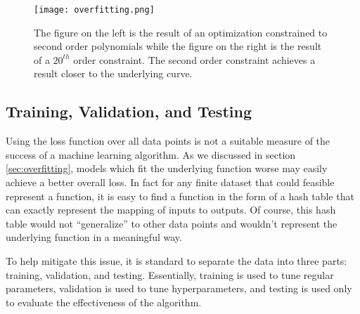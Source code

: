 \begin{figure}
    \centering
    \texttt{[image: overfitting.png]}
    \caption{The figure on the left is the result of an optimization constrained to second order polynomials while the figure on the right is the result of a $20^{th}$ order constraint.  The second order constraint achieves a result closer to the underlying curve.}
    \label{fig:poly_reg}
\end{figure}

\subsection{Training, Validation, and Testing}
Using the loss function over all data points is not a suitable measure of the success of a machine learning algorithm.  As we discussed in section \ref{sec:overfitting}, models which fit the underlying function worse may easily achieve a better overall loss.  In fact for any finite dataset that could feasible represent a function, it is easy to find a function in the form of a hash table that can exactly represent the mapping of inputs to outputs.  Of course, this hash table would not ``generalize'' to other data points and wouldn't represent the underlying function in a meaningful way.  

To help mitigate this issue, it is standard to separate the data into three parts: training, validation, and testing.  Essentially, training is used to tune regular parameters, validation is used to tune hyperparameters, and testing is used only to evaluate the effectiveness of the algorithm.
